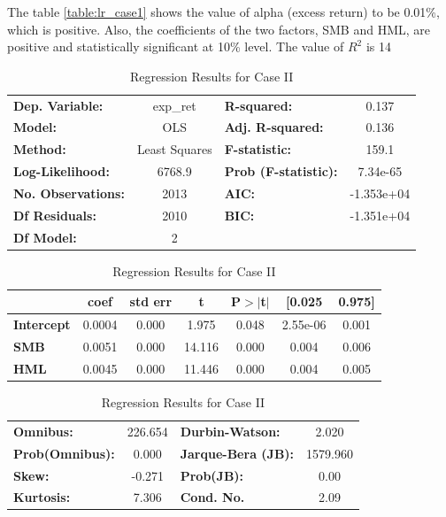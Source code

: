 The table \ref{table:lr_case1} shows the value of alpha (excess return) to be 0.01\%, which is positive. Also, the coefficients of the two factors, SMB and HML, are positive and statistically significant at 10\% level. The value of $R^2$ is 14\

\begin{table}
\centering
\begin{tabular}{|lc|lc|}
\hline
\textbf{Dep. Variable:}    &     exp\_ret      & \textbf{  R-squared:         } &     0.137   \\
\textbf{Model:}            &       OLS        & \textbf{  Adj. R-squared:    } &     0.136   \\
\textbf{Method:}           &  Least Squares   & \textbf{  F-statistic:       } &     159.1   \\
\textbf{Log-Likelihood:} &    6768.9 & \textbf{  Prob (F-statistic):} &  7.34e-65   \\
\textbf{No. Observations:} &        2013      & \textbf{  AIC:               } & -1.353e+04  \\
\textbf{Df Residuals:}     &        2010      & \textbf{  BIC:               } & -1.351e+04  \\
\textbf{Df Model:}         &           2      & \textbf{                     } &             \\
\hline
\end{tabular}

\bigskip

\begin{tabular}{|l|cccccc|}
\hline

                   & \textbf{coef} & \textbf{std err} & \textbf{t} & \textbf{P$>$$|$t$|$} & \textbf{[0.025} & \textbf{0.975]}  \\
\hline
\textbf{Intercept} &       0.0004  &        0.000     &     1.975  &         0.048        &     2.55e-06    &        0.001     \\
\textbf{SMB}       &       0.0051  &        0.000     &    14.116  &         0.000        &        0.004    &        0.006     \\
\textbf{HML}       &       0.0045  &        0.000     &    11.446  &         0.000        &        0.004    &        0.005     \\
\hline
\end{tabular}

\bigskip

\begin{tabular}{|lc|lc|}
\hline
\textbf{Omnibus:}       & 226.654 & \textbf{  Durbin-Watson:     } &    2.020  \\
\textbf{Prob(Omnibus):} &   0.000 & \textbf{  Jarque-Bera (JB):  } & 1579.960  \\
\textbf{Skew:}          &  -0.271 & \textbf{  Prob(JB):          } &     0.00  \\
\textbf{Kurtosis:}      &   7.306 & \textbf{  Cond. No.          } &     2.09  \\
\hline
\end{tabular}
\caption{Regression Results for Case II}
\label{table:lr_case2}
\end{table}

